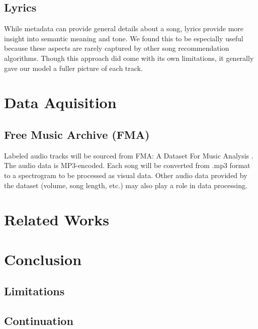 \subsection{Lyrics}
While metadata can provide general details about a song, lyrics provide more insight into semantic meaning and tone. We found this to be especially useful because these aspects are rarely captured by other song recommendation algorithms. Though this approach did come with its own limitations, it generally gave our model a fuller picture of each track.

\section{Data Aquisition}
\subsection{Free Music Archive (FMA)}
Labeled audio tracks will be sourced from FMA: A Dataset For Music Analysis \cite{defferrard2017}. The audio data is MP3-encoded. Each song will be converted from .mp3 format to a spectrogram to be processed as visual data. Other audio data provided by the dataset (volume, song length, etc.) may also play a role in data processing.

\section{Related Works}
\lipsum[6-7]

\section{Conclusion}
\lipsum[10]

\subsection{Limitations}
\lipsum[11]

\subsection{Continuation}
\lipsum[12]


